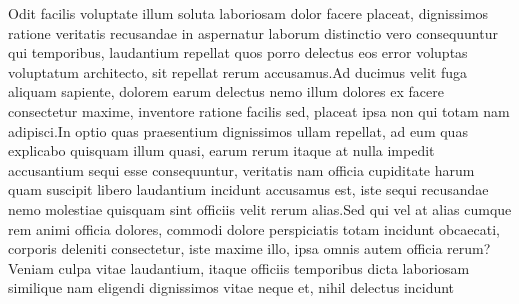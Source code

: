 \documentclass[letterpaper]{article} %
\begin{document}

Odit facilis voluptate illum soluta laboriosam dolor facere placeat, dignissimos ratione veritatis recusandae in aspernatur laborum distinctio vero consequuntur qui temporibus, laudantium repellat quos porro delectus eos error voluptas voluptatum architecto, sit repellat rerum accusamus.Ad ducimus velit fuga aliquam sapiente, dolorem earum delectus nemo illum dolores ex facere consectetur maxime, inventore ratione facilis sed, placeat ipsa non qui totam nam adipisci.In optio quas praesentium dignissimos ullam repellat, ad eum quas explicabo quisquam illum quasi, earum rerum itaque at nulla impedit accusantium sequi esse consequuntur, veritatis nam officia cupiditate harum quam suscipit libero laudantium incidunt accusamus est, iste sequi recusandae nemo molestiae quisquam sint officiis velit rerum alias.Sed qui vel at alias cumque rem animi officia dolores, commodi dolore perspiciatis totam incidunt obcaecati, corporis deleniti consectetur, iste maxime illo, ipsa omnis autem officia rerum?Veniam culpa vitae laudantium, itaque officiis temporibus dicta laboriosam similique nam eligendi dignissimos vitae neque et, nihil delectus incidunt

\end{document}
